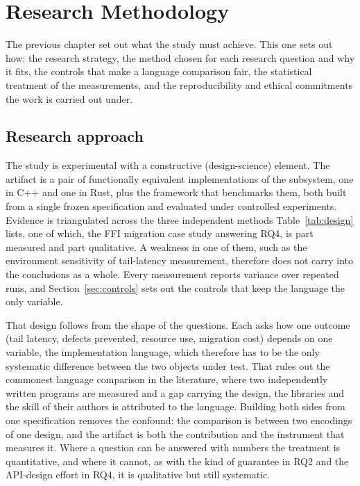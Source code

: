 \chapter{Research Methodology\label{chapter:methodology}}

The previous chapter set out what the study must achieve. This one sets out how: the research
strategy, the method chosen for each research question and why it fits, the controls that make a
language comparison fair, the statistical treatment of the measurements, and the reproducibility
and ethical commitments the work is carried out under.

\section{Research approach}\label{sec:approach}
The study is experimental with a constructive (design-science) element. The artifact is a pair
of functionally equivalent implementations of the subsystem, one in C++ and one in Rust, plus
the framework that benchmarks them, both built from a single frozen specification and evaluated
under controlled experiments. Evidence is triangulated across the three independent methods
Table~\ref{tab:design} lists, one of which, the FFI migration case study answering RQ4, is part
measured and part qualitative. A weakness in one of them, such as the
environment sensitivity of tail-latency measurement, therefore does not carry into the
conclusions as a whole. Every measurement reports variance over repeated runs, and
Section~\ref{sec:controls} sets out the controls that keep the language the only variable.

That design follows from the shape of the questions. Each asks how one outcome (tail latency,
defects prevented, resource use, migration cost) depends on one variable, the implementation
language, which therefore has to be the only systematic difference between the two objects under
test. That rules out the commonest language comparison in the literature, where two
independently written programs are measured and a gap carrying the design, the libraries and the
skill of their authors is attributed to the language. Building both sides from one specification
removes the confound: the comparison is between two encodings of one design, and the artifact is
both the contribution and the instrument that measures it. Where a question can be answered with
numbers the treatment is quantitative, and where it cannot, as with the kind of guarantee in RQ2
and the API-design effort in RQ4, it is qualitative but still systematic.

